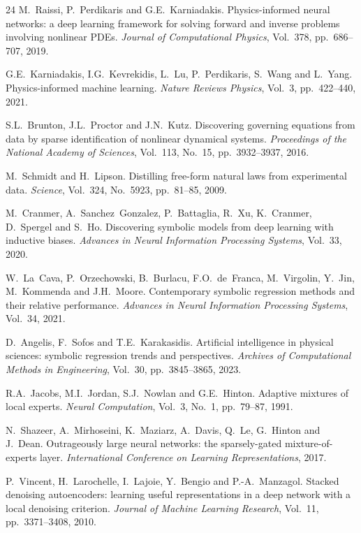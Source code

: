 \documentclass{WCCM-ECCOMAS_2026_Full_Paper}
\begin{document}
\begin{thebibliography}{24}
M.~Raissi, P.~Perdikaris and G.E.~Karniadakis.
Physics-informed neural networks: a deep learning framework for
solving forward and inverse problems involving nonlinear PDEs.
\textit{Journal of Computational Physics}, Vol.~378, pp.~686--707, 2019.

G.E.~Karniadakis, I.G.~Kevrekidis, L.~Lu, P.~Perdikaris, S.~Wang
and L.~Yang.
Physics-informed machine learning.
\textit{Nature Reviews Physics}, Vol.~3, pp.~422--440, 2021.

S.L.~Brunton, J.L.~Proctor and J.N.~Kutz.
Discovering governing equations from data by sparse identification
of nonlinear dynamical systems.
\textit{Proceedings of the National Academy of Sciences},
Vol.~113, No.~15, pp.~3932--3937, 2016.

M.~Schmidt and H.~Lipson.
Distilling free-form natural laws from experimental data.
\textit{Science}, Vol.~324, No.~5923, pp.~81--85, 2009.

M.~Cranmer, A.~Sanchez~Gonzalez, P.~Battaglia, R.~Xu, K.~Cranmer,
D.~Spergel and S.~Ho.
Discovering symbolic models from deep learning with inductive biases.
\textit{Advances in Neural Information Processing Systems},
Vol.~33, 2020.

W.~La~Cava, P.~Orzechowski, B.~Burlacu, F.O.~de~Franca,
M.~Virgolin, Y.~Jin, M.~Kommenda and J.H.~Moore.
Contemporary symbolic regression methods and their relative
performance.
\textit{Advances in Neural Information Processing Systems},
Vol.~34, 2021.

D.~Angelis, F.~Sofos and T.E.~Karakasidis.
Artificial intelligence in physical sciences: symbolic regression
trends and perspectives.
\textit{Archives of Computational Methods in Engineering},
Vol.~30, pp.~3845--3865, 2023.

R.A.~Jacobs, M.I.~Jordan, S.J.~Nowlan and G.E.~Hinton.
Adaptive mixtures of local experts.
\textit{Neural Computation}, Vol.~3, No.~1, pp.~79--87, 1991.

N.~Shazeer, A.~Mirhoseini, K.~Maziarz, A.~Davis, Q.~Le,
G.~Hinton and J.~Dean.
Outrageously large neural networks: the sparsely-gated
mixture-of-experts layer.
\textit{International Conference on Learning Representations}, 2017.

P.~Vincent, H.~Larochelle, I.~Lajoie, Y.~Bengio and
P.-A.~Manzagol.
Stacked denoising autoencoders: learning useful representations in
a deep network with a local denoising criterion.
\textit{Journal of Machine Learning Research}, Vol.~11,
pp.~3371--3408, 2010.


\end{thebibliography}
\end{document}

